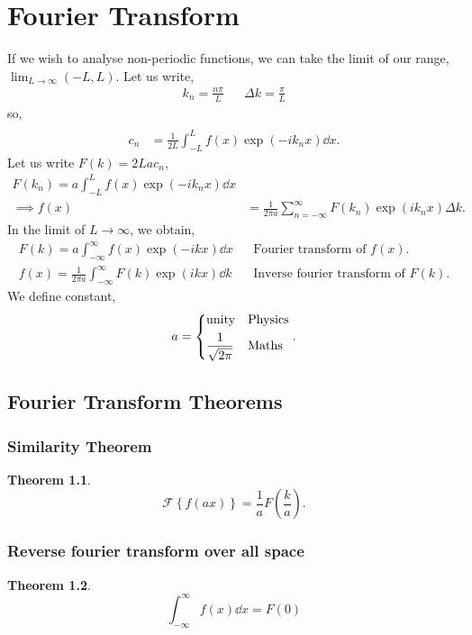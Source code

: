 \documentclass{book}
\newtheorem*{theorem}{Theorem}
\begin{document}
\chapter{Fourier Transform}
If we wish to analyse non-periodic functions, we can take the limit of our range, $\lim_{L\to\infty}(-L,L)$. Let us write,
\begin{align}
	k_n = \frac{n\pi}{L} && \Delta k = \frac{\pi}{L}
\end{align}
so,
\begin{align}
	 \\
	c_n & = \frac{1}{2L}\int_{-L}^{L}f(x)\exp\left(-ik_nx\right)\dd{x}.
\end{align}
Let us write $F(k) = 2Lac_n$,
\begin{align}
	F(k_n) = a\int_{-L}^{L}f(x)\exp\left(-ik_nx\right)\dd{x} \\
	\implies f(x) &= \frac{1}{2\pi a}\sum_{n = -\infty}^{\infty} F(k_n)\exp\left(i k_nx\right)\Delta k.
\end{align}
In the limit of $L \to \infty$, we obtain,
\begin{align}
	\boxed{F(k) = a\int_{-\infty}^{\infty}f(x)\exp(-ikx)\dd{x}} && \text{Fourier transform of $f(x)$.}\\
	\boxed{f(x) = \frac{1}{2\pi a}\int_{-\infty}^{\infty}F(k)\exp(ikx)\dd{k}} && \text{Inverse fourier transform of $F(k)$.}
\end{align}
We define constant,
\begin{equation}
	a = \begin{dcases}
		\text{unity} & \text{Physics} \\
		\frac{1}{\sqrt{2\pi}} & \text{Maths}
	\end{dcases}.
\end{equation}
\section{Fourier Transform Theorems}
\subsection{Similarity Theorem}
\begin{theorem}
	\begin{equation}
		\boxed{\mathscr{F}\left\{f(ax)\right\} = \frac{1}{a}F\left(\frac{k}{a}\right)}.
	\end{equation}
\end{theorem}
\subsection{Reverse fourier transform over all space}
\begin{theorem}
	\begin{equation}
		\boxed{\int_{-\infty}^{\infty}f(x)\dd{x} = F(0)}
	\end{equation}
\end{theorem}
\end{document}
